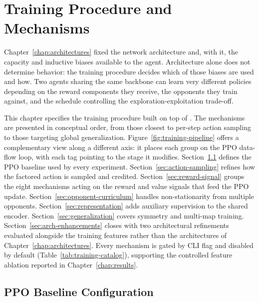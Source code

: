 \chapter{Training Procedure and Mechanisms}
\label{chap:training-system}


Chapter~\ref{chap:architectures} fixed the network architecture and, with it, the capacity and inductive biases available to the agent. Architecture alone does not determine behavior: the training procedure decides which of those biases are used and how. Two agents sharing the same  backbone can learn very different policies depending on the reward components they receive, the opponents they train against, and the schedule controlling the exploration-exploitation trade-off.

This chapter specifies the training procedure built on top of . The mechanisms are presented in conceptual order, from those closest to per-step action sampling to those targeting global generalization. Figure~\ref{fig:training-pipeline} offers a complementary view along a different axis: it places each group on the PPO data-flow loop, with each tag pointing to the stage it modifies. Section~\ref{sec:training-algo} defines the PPO baseline used by every experiment. Section~\ref{sec:action-sampling} refines how the factored action is sampled and credited. Section~\ref{sec:reward-signal} groups the eight mechanisms acting on the reward and value signals that feed the PPO update. Section~\ref{sec:opponent-curriculum} handles non-stationarity from multiple opponents. Section~\ref{sec:representation} adds auxiliary supervision to the shared encoder. Section~\ref{sec:generalization} covers symmetry and multi-map training. Section~\ref{sec:arch-enhancements} closes with two architectural refinements evaluated alongside the training features rather than the architectures of Chapter~\ref{chap:architectures}. Every mechanism is gated by CLI flag and disabled by default (Table~\ref{tab:training-catalog}), supporting the controlled feature ablation reported in Chapter~\ref{chap:results}.
         
\vspace{-0.3em}

\section{PPO Baseline Configuration}
\label{sec:training-algo}

